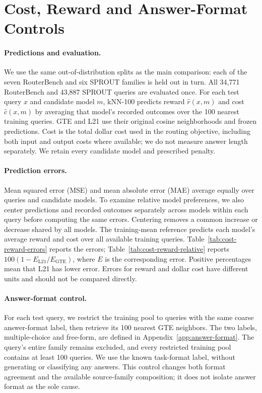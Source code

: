 \section{Cost, Reward and Answer-Format Controls}
\label{app:cost-reward-format}

\paragraph{Predictions and evaluation.}
We use the same out-of-distribution splits as the main comparison: each of the seven RouterBench and six SPROUT families is held out in turn.
All 34,771 RouterBench and 43,887 SPROUT queries are evaluated once.
For each test query $x$ and candidate model $m$, kNN-100 predicts reward $\widehat r(x,m)$ and cost $\widehat c(x,m)$ by averaging that model's recorded outcomes over the 100 nearest training queries.
GTE and L21 use their original cosine neighborhoods and frozen predictions.
Cost is the total dollar cost used in the routing objective, including both input and output costs where available; we do not measure answer length separately.
We retain every candidate model and prescribed penalty.

\paragraph{Prediction errors.}
Mean squared error (MSE) and mean absolute error (MAE) average equally over queries and candidate models.
To examine relative model preferences, we also center predictions and recorded outcomes separately across models within each query before computing the same errors.
Centering removes a common increase or decrease shared by all models.
The training-mean reference predicts each model's average reward and cost over all available training queries.
Table~\ref{tab:cost-reward-errors} reports the errors; Table~\ref{tab:cost-reward-relative} reports $100(1-E_{\mathrm{L21}}/E_{\mathrm{GTE}})$, where $E$ is the corresponding error.
Positive percentages mean that L21 has lower error.
Errors for reward and dollar cost have different units and should not be compared directly.

\paragraph{Answer-format control.}
For each test query, we restrict the training pool to queries with the same coarse answer-format label, then retrieve its 100 nearest GTE neighbors.
The two labels, multiple-choice and free-form, are defined in Appendix~\ref{app:answer-format}.
The query's entire family remains excluded, and every restricted training pool contains at least 100 queries.
We use the known task-format label, without generating or classifying any answers.
This control changes both format agreement and the available source-family composition; it does not isolate answer format as the sole cause.

